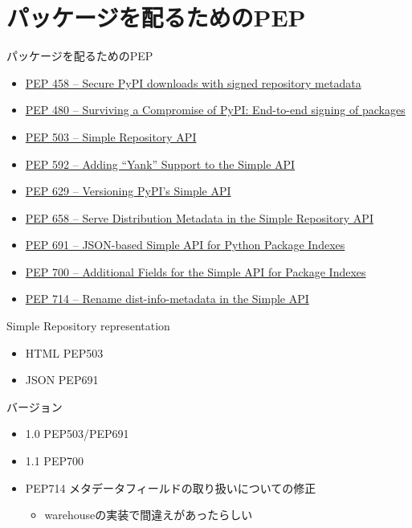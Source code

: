 \documentclass[presentation]{beamer}
\begin{document}
\section{パッケージを配るためのPEP}
\label{sec:orgd5ebd40}
\begin{frame}[label={sec:org24836f8}]{パッケージを配るためのPEP}
\begin{itemize}
\item \href{https://peps.python.org/pep-0458}{PEP 458 – Secure PyPI downloads with signed repository metadata}
\item \href{https://peps.python.org/pep-0480}{PEP 480 – Surviving a Compromise of PyPI: End-to-end signing of packages}
\item \href{https://peps.python.org/pep-0503/}{PEP 503 – Simple Repository API}
\item \href{https://peps.python.org/pep-0592}{PEP 592 – Adding “Yank” Support to the Simple API}
\item \href{https://peps.python.org/pep-0629}{PEP 629 – Versioning PyPI’s Simple API}
\item \href{https://peps.python.org/pep-0658}{PEP 658 – Serve Distribution Metadata in the Simple Repository API}
\item \href{https://peps.python.org/pep-0691}{PEP 691 – JSON-based Simple API for Python Package Indexes}
\item \href{https://peps.python.org/pep-0700}{PEP 700 – Additional Fields for the Simple API for Package Indexes}
\item \href{https://peps.python.org/pep-0714}{PEP 714 – Rename dist-info-metadata in the Simple API}
\end{itemize}
\end{frame}

\begin{frame}[label={sec:org71cb375}]{Simple Repository}
representation

\begin{itemize}
\item HTML PEP503
\item JSON PEP691
\end{itemize}

バージョン
\begin{itemize}
\item 1.0 PEP503/PEP691
\item 1.1 PEP700
\item PEP714 メタデータフィールドの取り扱いについての修正
\begin{itemize}
\item warehouseの実装で間違えがあったらしい
\end{itemize}
\end{itemize}
\end{frame}
\end{document}
